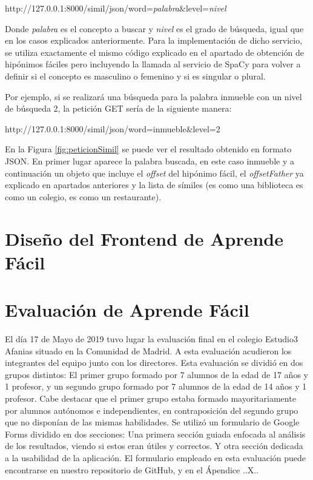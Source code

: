 http://127.0.0.1:8000/simil/json/word=\textit{palabra}\&level=\textit{nivel}

Donde \textit{palabra} es el concepto a buscar y \textit{nivel} es el grado de búsqueda, igual que en los casos explicados anteriormente.
Para la implementación de dicho servicio, se utiliza exactamente el mismo código explicado en el apartado de obtención de hipónimos fáciles pero incluyendo la llamada al servicio de SpaCy para volver a definir si el concepto es masculino o femenino y si es singular o plural.

Por ejemplo, si se realizará una búsqueda para la palabra inmueble con un nivel de búsqueda 2, la petición GET sería de la siguiente manera:

http://127.0.0.1:8000/simil/json/word=inmueble\&level=2

En la Figura \ref{fig:peticionSimil} se puede ver el resultado obtenido en formato JSON. En primer lugar aparece la palabra buscada, en este caso inmueble y a continuación un objeto que incluye el \textit{offset} del hipónimo fácil, el \textit{offsetFather}  ya explicado en apartados anteriores y la lista de símiles (es como una biblioteca es como un colegio, es como un restaurante).




\section{Diseño del Frontend  de Aprende Fácil}

\section{Evaluación de Aprende Fácil}

El día 17 de Mayo de 2019 tuvo lugar la evaluación final en el colegio Estudio3 Afanias situado en la Comunidad de Madrid. A esta evaluación acudieron los integrantes del equipo junto con los directores.
Esta evaluación se dividió en dos grupos distintos: El primer grupo formado por 7 alumnos de la edad de 17 años y 1 profesor, y un segundo grupo formado por 7 alumnos de la edad de 14 años y 1 profesor.
Cabe destacar que el primer grupo estaba formado mayoritariamente por alumnos autónomos e independientes, en contraposición del segundo grupo que no disponían de las mismas habilidades.
Se utilizó un formulario de Google Forms dividido en dos secciones: Una primera sección guiada enfocada al análisis de los resultados, viendo si estos eran útiles y correctos. Y otra sección dedicada a la usabilidad de la aplicación.
El formulario empleado en esta evaluación puede encontrarse en nuestro repositorio de GitHub, y en el Ápendice ..X..


